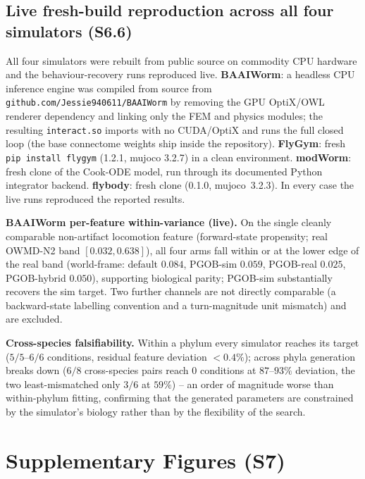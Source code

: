 \documentclass[11pt]{article}
\begin{document}
\subsection{Live fresh-build reproduction across all four simulators (S6.6)}
\label{si:freshbuild}
All four simulators were rebuilt from public source on commodity CPU hardware and the behaviour-recovery runs reproduced live. \textbf{BAAIWorm}: a headless CPU inference engine was compiled from source from \texttt{github.com/Jessie940611/BAAIWorm} by removing the GPU OptiX/OWL renderer dependency and linking only the FEM and physics modules; the resulting \texttt{interact.so} imports with no CUDA/OptiX and runs the full closed loop (the base connectome weights ship inside the repository). \textbf{FlyGym}: fresh \texttt{pip install flygym} (1.2.1, mujoco 3.2.7) in a clean environment. \textbf{modWorm}: fresh clone of the Cook-ODE model, run through its documented Python integrator backend. \textbf{flybody}: fresh clone (0.1.0, mujoco~3.2.3). In every case the live runs reproduced the reported results.

\textbf{BAAIWorm per-feature within-variance (live).} On the single cleanly comparable non-artifact locomotion feature (forward-state propensity; real OWMD-N2 band $[0.032,0.638]$), all four arms fall within or at the lower edge of the real band (world-frame: default $0.084$, PGOB-sim $0.059$, PGOB-real $0.025$, PGOB-hybrid $0.050$), supporting biological parity; PGOB-sim substantially recovers the sim target. Two further channels are not directly comparable (a backward-state labelling convention and a turn-magnitude unit mismatch) and are excluded.

\textbf{Cross-species falsifiability.} Within a phylum every simulator reaches its target ($5/5$--$6/6$ conditions, residual feature deviation $<0.4\%$); across phyla generation breaks down ($6/8$ cross-species pairs reach $0$ conditions at $87$--$93\%$ deviation, the two least-mismatched only $3/6$ at $59\%$) -- an order of magnitude worse than within-phylum fitting, confirming that the generated parameters are constrained by the simulator's biology rather than by the flexibility of the search.

\section{Supplementary Figures (S7)}
\label{si:supp_figs}
\end{document}
